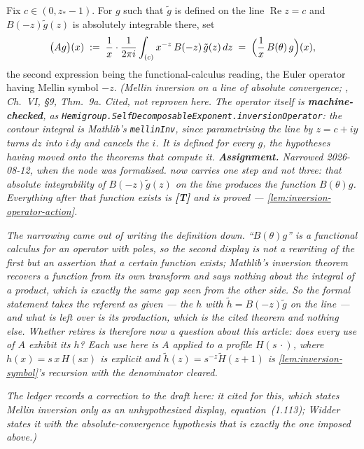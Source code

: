 \begin{definition}\label{def:inversion-operator}
\leanok
Fix $c \in (0, z_* - 1)$. For $g$ such that $\tilde g$ is defined on the line
$\operatorname{Re} z = c$ and $B(-z)\tilde g(z)$ is absolutely integrable there, set
\[
  \bigl(A g\bigr)(x) \;:=\; \frac{1}{x}\cdot \frac{1}{2\pi i}\int_{(c)} x^{-z}\, B(-z)\,\tilde g(z)\,dz
  \;=\; \Bigl(\frac{1}{x}\,B(\theta)\,g\Bigr)(x),
\]
the second expression being the functional-calculus reading, the Euler operator having Mellin
symbol $-z$.
\statusA\quad{}\quad\emph{(Mellin inversion on a line of absolute convergence;
, Ch.~VI, \S9, Thm.~9a. Cited, not reproven here. The operator itself is
\textbf{machine-checked}, as \texttt{Hemigroup.SelfDecomposableExponent.inversionOperator}: the
contour integral is Mathlib's \texttt{mellinInv}, since parametrising the line by $z = c + iy$
turns $dz$ into $i\,dy$ and cancels the $i$. It is defined for \emph{every} $g$, the hypotheses
having moved onto the theorems that compute it.
\textbf{Assignment.} Narrowed 2026-08-12, when the node was formalised.  now
carries one step and not three: that absolute integrability of $B(-z)\tilde g(z)$ on the line
produces the function $B(\theta)g$. Everything after that function exists is \textbf{[T]} and is
proved --- \ref{lem:inversion-operator-action}.}

\emph{The narrowing came out of writing the definition
down. ``$B(\theta)g$'' is a functional calculus for an operator with poles, so the second display
is not a rewriting of the first but an assertion that a certain function \emph{exists}; Mathlib's
inversion theorem recovers a function from its own transform and says nothing about the integral
of a product, which is exactly the same gap seen from the other side. So the formal statement
takes the referent as given --- the $h$ with $\tilde h = B(-z)\tilde g$ on the line --- and what
is left over is its production, which is the cited theorem and nothing else. Whether 
retires is therefore now a question about \emph{this article}: does every use of $A$ exhibit its
$h$? Each use here is $A$ applied to a profile $H(s\,\cdot)$, where $h(x) = s\,x\,H(sx)$ is
explicit and $\tilde h(z) = s^{-z}\tilde H(z+1)$ is \ref{lem:inversion-symbol}'s recursion with
the denominator cleared.}

\emph{The ledger records a correction to the draft here: it cited  for
this, which states Mellin inversion only as an unhypothesized display, equation~(1.113); Widder
states it with the absolute-convergence hypothesis that is exactly the one imposed above.)}
\end{definition}

